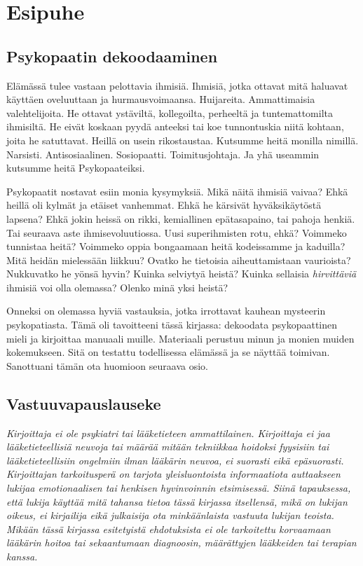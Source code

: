 \chapter{Esipuhe}\label{preface}

\section{Psykopaatin dekoodaaminen}

Elämässä tulee vastaan pelottavia ihmisiä. Ihmisiä, jotka ottavat mitä haluavat käyttäen oveluuttaan ja hurmausvoimaansa. Huijareita. Ammattimaisia valehtelijoita. He ottavat ystäviltä, kollegoilta, perheeltä ja tuntemattomilta ihmisiltä. He eivät koskaan pyydä anteeksi tai koe tunnontuskia niitä kohtaan, joita he satuttavat. Heillä on usein rikostaustaa. Kutsumme heitä monilla nimillä. Narsisti. Antisosiaalinen. Sosiopaatti. Toimitusjohtaja. Ja yhä useammin kutsumme heitä Psykopaateiksi.

Psykopaatit nostavat esiin monia kysymyksiä. Mikä näitä ihmisiä vaivaa? Ehkä heillä oli kylmät ja etäiset vanhemmat. Ehkä he kärsivät hyväksikäytöstä lapsena? Ehkä jokin heissä on rikki, kemiallinen epätasapaino, tai pahoja henkiä. Tai seuraava aste ihmisevoluutiossa. Uusi superihmisten rotu, ehkä? Voimmeko tunnistaa heitä? Voimmeko oppia bongaamaan heitä kodeissamme ja kaduilla? Mitä heidän mielessään liikkuu? Ovatko he tietoisia aiheuttamistaan vaurioista? Nukkuvatko he yönsä hyvin? Kuinka selviytyä heistä? Kuinka sellaisia \emph{hirvittäviä} ihmisiä voi olla olemassa? Olenko minä yksi heistä?

Onneksi on olemassa hyviä vastauksia, jotka irrottavat kauhean mysteerin psykopatiasta. Tämä oli tavoitteeni tässä kirjassa: dekoodata psykopaattinen mieli ja kirjoittaa manuaali muille. Materiaali perustuu minun ja monien muiden kokemukseen. Sitä on testattu todellisessa elämässä ja se näyttää toimivan. Sanottuani tämän ota huomioon seuraava osio.

\section{Vastuuvapauslauseke}

\emph{Kirjoittaja ei ole psykiatri tai lääketieteen ammattilainen. Kirjoittaja ei jaa lääketieteellisiä neuvoja tai määrää mitään tekniikkaa hoidoksi fyysisiin tai lääketieteellisiin ongelmiin ilman lääkärin neuvoa, ei suorasti eikä epäsuorasti. Kirjoittajan tarkoitusperä on tarjota yleisluontoista informaatiota auttaakseen lukijaa emotionaalisen tai henkisen hyvinvoinnin etsimisessä. Siinä tapauksessa, että lukija käyttää mitä tahansa tietoa tässä kirjassa itsellensä, mikä on lukijan oikeus, ei kirjailija eikä julkaisija ota minkäänlaista vastuuta lukijan teoista. Mikään tässä kirjassa esitetyistä ehdotuksista ei ole tarkoitettu korvaamaan lääkärin hoitoa tai sekaantumaan diagnoosin, määrättyjen lääkkeiden tai terapian kanssa.}

